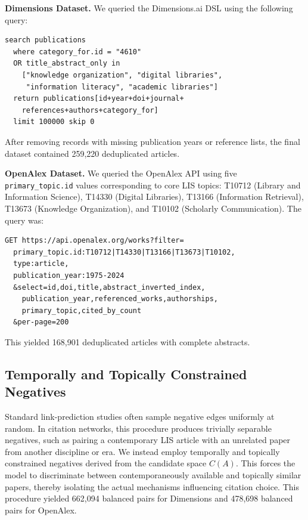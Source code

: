 \documentclass[11pt,a4paper]{article}
\begin{document}
\textbf{Dimensions Dataset.}
We queried the Dimensions.ai DSL using the following query:

\begin{verbatim}
search publications
  where category_for.id = "4610"
  OR title_abstract_only in
    ["knowledge organization", "digital libraries",
     "information literacy", "academic libraries"]
  return publications[id+year+doi+journal+
    references+authors+category_for]
  limit 100000 skip 0
\end{verbatim}

After removing records with missing publication years or reference lists, the final dataset contained 259,220 deduplicated articles.

\textbf{OpenAlex Dataset.}
We queried the OpenAlex API using five \texttt{primary\_topic.id} values corresponding to core LIS topics: T10712 (Library and Information Science), T14330 (Digital Libraries), T13166 (Information Retrieval), T13673 (Knowledge Organization), and T10102 (Scholarly Communication). The query was:

\begin{verbatim}
GET https://api.openalex.org/works?filter=
  primary_topic.id:T10712|T14330|T13166|T13673|T10102,
  type:article,
  publication_year:1975-2024
  &select=id,doi,title,abstract_inverted_index,
    publication_year,referenced_works,authorships,
    primary_topic,cited_by_count
  &per-page=200
\end{verbatim}

This yielded 168,901 deduplicated articles with complete abstracts.

\subsection{Temporally and Topically Constrained Negatives}

Standard link-prediction studies often sample negative edges uniformly at random. In citation networks, this procedure produces trivially separable negatives, such as pairing a contemporary LIS article with an unrelated paper from another discipline or era. We instead employ temporally and topically constrained negatives derived from the candidate space \(C(A)\). This forces the model to discriminate between contemporaneously available and topically similar papers, thereby isolating the actual mechanisms influencing citation choice. This procedure yielded 662,094 balanced pairs for Dimensions and 478,698 balanced pairs for OpenAlex.
\end{document}
